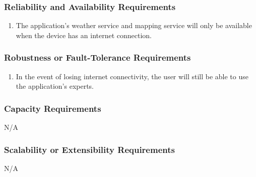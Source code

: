 \documentclass[titlepage]{article}
\newcounter{myCounter}
\begin{document}
\subsubsection{Reliability and Availability Requirements}
\label{ssub:reliability_and_availability_requirements}
\begin{enumerate}[{PR}1. ]
    \setcounter{enumi}{\themyCounter}
    \item The application's weather service and mapping service will only be available when the
    device has an internet connection.
    \setcounter{myCounter}{\theenumi}
\end{enumerate}

\subsubsection{Robustness or Fault-Tolerance Requirements}
\label{ssub:robustness_or_fault_tolerance_requirements}
\begin{enumerate}[{PR}1. ]
    \setcounter{enumi}{\themyCounter}
	\item In the event of losing internet connectivity, the user will still be able to use the application's experts. 
    \setcounter{myCounter}{\theenumi}
\end{enumerate}

\subsubsection{Capacity Requirements}
\label{ssub:capacity_requirements}
N/A

\subsubsection{Scalability or Extensibility Requirements}
\label{ssub:scalability_or_extensibility_requirements}
N/A
\end{document}
